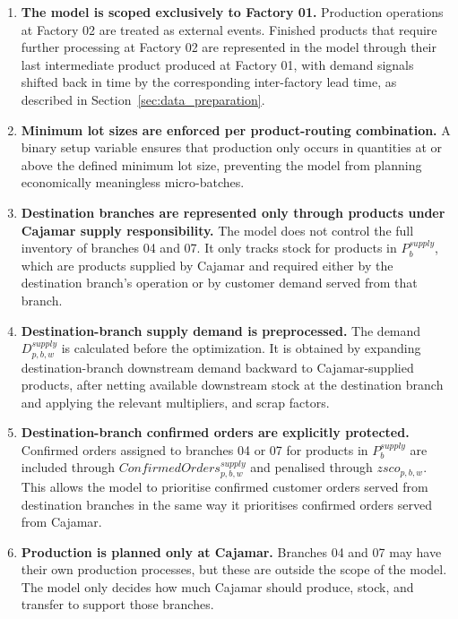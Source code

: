\documentclass{article}
\begin{document}
\begin{enumerate}
    \item \textbf{The model is scoped exclusively to Factory 01.} Production operations at Factory 02 are treated as external events. Finished products that require further processing at Factory 02 are represented in the model through their last intermediate product produced at Factory 01, with demand signals shifted back in time by the corresponding inter-factory lead time, as described in Section~\ref{sec:data_preparation}.

    \item \textbf{Minimum lot sizes are enforced per product-routing combination.} A binary setup variable ensures that production only occurs in quantities at or above the defined minimum lot size, preventing the model from planning economically meaningless micro-batches.

    \item \textbf{Destination branches are represented only through products under Cajamar supply responsibility.}
    The model does not control the full inventory of branches 04 and 07. It only tracks stock for products in $P^{supply}_b$, which are products supplied by Cajamar and required either by the destination branch's operation or by customer demand served from that branch.
    
    \item \textbf{Destination-branch supply demand is preprocessed.}
     The demand $D^{supply}_{p,b,w}$ is calculated before the optimization. It is obtained by expanding destination-branch downstream demand backward to Cajamar-supplied products, after netting available downstream stock at the destination branch and applying the relevant multipliers, and scrap factors.
    
    \item \textbf{Destination-branch confirmed orders are explicitly protected.}
    Confirmed orders assigned to branches 04 or 07 for products in $P^{supply}_b$ are included through $ConfirmedOrders^{supply}_{p,b,w}$ and penalised through $zsco_{p,b,w}$. This allows the model to prioritise confirmed customer orders served from destination branches in the same way it prioritises confirmed orders served from Cajamar.
    
    \item \textbf{Production is planned only at Cajamar.}
    Branches 04 and 07 may have their own production processes, but these are outside the scope of the model. The model only decides how much Cajamar should produce, stock, and transfer to support those branches.
    

\end{enumerate}
\end{document}
